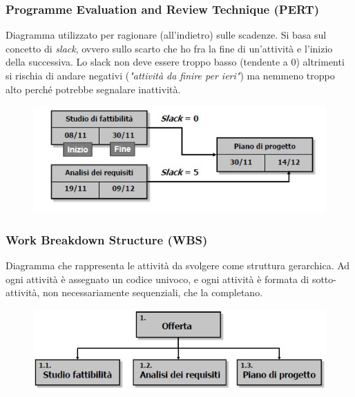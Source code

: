 \documentclass[../main]{subfiles}
\begin{document}
\subsubsection{Programme Evaluation and Review Technique (PERT)}
Diagramma utilizzato per ragionare (all'indietro) sulle scadenze. Si basa sul concetto di \textit{slack}, ovvero sullo scarto che ho fra la fine di un'attività e l'inizio della successiva. Lo slack non deve essere troppo basso (tendente a 0) altrimenti si rischia di andare negativi (\textit{"attività da finire per ieri"}) ma nemmeno troppo alto perché potrebbe segnalare inattività.
\begin{figure}[h]
    \begin{center}
        \includegraphics[scale=0.8]{immagini/pert.jpg}
    \end{center}
\end{figure}
\subsubsection{Work Breakdown Structure (WBS)}
Diagramma che rappresenta le attività da svolgere come struttura gerarchica. Ad ogni attività è assegnato un codice univoco, e ogni attività è formata di sotto-attività, non necessariamente sequenziali, che la completano.
\begin{figure}[h]
    \begin{center}
        \includegraphics[scale=0.8]{immagini/wbs.jpg}
    \end{center}
\end{figure}
\end{document}
